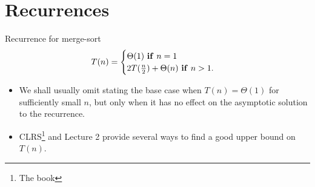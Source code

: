 \documentclass{beamer}
\begin{document}
\section{Recurrences}

\begin{frame}{Recurrence for merge-sort}
    \centering
    $$
        T(n) =
            \begin{cases}
                \Theta(1) \text{ \textbf{if} } n = 1 \\
                2T(\frac{n}{2}) + \Theta(n)  \text{ \textbf{if} }  n > 1. \\
            \end{cases}       
    $$
    \begin{itemize}
        \item We shall usually omit stating the base case when $T(n) = \Theta(1)$ for sufficiently small $n$, but only when it has no effect on the asymptotic solution to the recurrence.
        \item CLRS\footnote{The book} and Lecture 2 provide several ways to find a good upper bound on $T(n)$.
    \end{itemize}

\end{frame}
\end{document}
